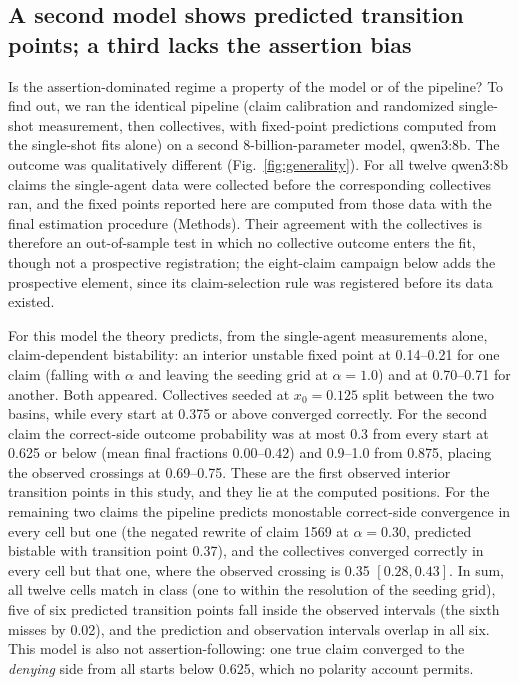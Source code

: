 \documentclass[11pt]{article}
\begin{document}
\subsection{A second model shows predicted transition points; a third lacks the assertion bias}\label{sec:generality}

Is the assertion-dominated regime a property of the model or of the
pipeline? To find out, we ran the identical pipeline (claim calibration and
randomized single-shot measurement, then collectives, with fixed-point
predictions computed from the single-shot fits alone) on a second
8-billion-parameter model, qwen3:8b. The outcome was qualitatively
different (Fig.~\ref{fig:generality}). For all twelve qwen3:8b claims the
single-agent data were collected before the corresponding collectives ran,
and the fixed points reported here are computed from those data with the
final estimation procedure (Methods). Their agreement with the collectives
is therefore an out-of-sample test in which no collective outcome enters
the fit, though not a prospective registration; the eight-claim campaign
below adds the prospective element, since its claim-selection rule was
registered before its data existed.

For this model the theory predicts, from the single-agent measurements
alone, claim-dependent bistability: an interior unstable fixed point at
0.14--0.21 for one claim (falling with $\alpha$ and leaving the seeding
grid at $\alpha = 1.0$) and at 0.70--0.71 for another. Both appeared.
Collectives seeded at $x_0 = 0.125$ split between the two basins, while
every start at 0.375 or above converged correctly. For the second claim
the correct-side outcome probability was at most 0.3 from every start at
0.625 or below (mean final fractions 0.00--0.42) and 0.9--1.0 from 0.875,
placing the observed crossings at 0.69--0.75. These are the first observed
interior transition points in this study, and they lie at the computed
positions. For the remaining two claims the pipeline predicts monostable
correct-side convergence in every cell but one (the negated rewrite of
claim 1569 at $\alpha = 0.30$, predicted bistable with transition point
0.37), and the collectives converged correctly in every cell but that one,
where the observed crossing is 0.35 $[0.28, 0.43]$. In sum, all twelve
cells match in class (one to within the resolution of the seeding grid),
five of six predicted transition points fall inside the observed intervals
(the sixth misses by 0.02), and the prediction and observation intervals
overlap in all six. This model is also not assertion-following: one true
claim converged to the \emph{denying} side from all starts below 0.625,
which no polarity account permits.
\end{document}
